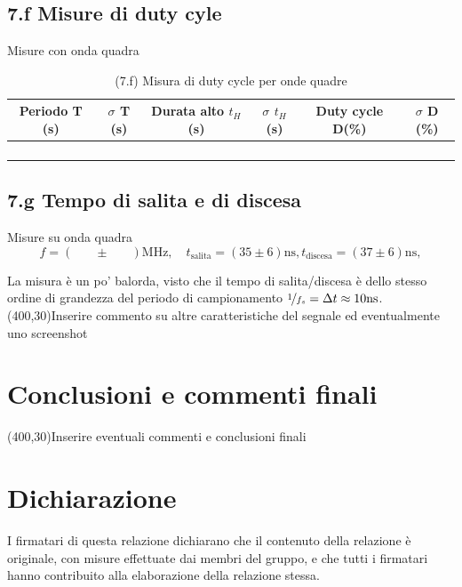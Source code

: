 \documentclass[10pt,a4paper]{article}
\newcommand{\exn}{\phantom{xxx}}
\begin{document}
\subsection*{7.f Misure di duty cyle}
Misure con onda quadra
\begin{table}[h]
\centering
\begin{tabular}{|c|c|c|c|c|c|}
\hline 
Periodo T (s)& $\sigma$ T (s) & Durata alto $t_H$ (s) & $\sigma$ $t_H$ (s)
& Duty cycle D(\%) & $\sigma$ D (\%) \\
\hline 
\exn & \exn & \exn & \exn & \exn &\exn \\
\exn & \exn & \exn & \exn & \exn &\exn \\
\exn & \exn & \exn & \exn & \exn &\exn \\
\exn & \exn & \exn & \exn & \exn &\exn \\
\hline 
\end{tabular} 
\caption{(7.f) Misura di duty cycle per onde quadre }
\end{table}


\subsection*{7.g Tempo di salita e di discesa}
Misure su onda quadra
\[
f = (\exn \pm \exn) \mathrm{MHz}, \quad
t_\mathrm{salita} = (35 \pm 6) \mathrm{ns},
t_\mathrm{discesa} = (37 \pm 6) \mathrm{ns},
\]

La misura è un po' balorda, visto che il tempo di salita/discesa è dello
stesso ordine di grandezza del periodo di campionamento $\nicefrac{1}{f_s} = \Delta t \approx 10 \si{\ns}$.
\framebox(400,30){Inserire commento su altre caratteristiche del segnale
ed eventualmente uno screenshot}

\section{Conclusioni e commenti finali}
\framebox(400,30){Inserire eventuali commenti e conclusioni finali}

\section*{Dichiarazione}
I firmatari di questa relazione dichiarano che il contenuto della relazione
\`e originale, con misure effettuate dai membri del gruppo, e che tutti i
firmatari hanno contribuito alla elaborazione della relazione stessa.
\end{document}
